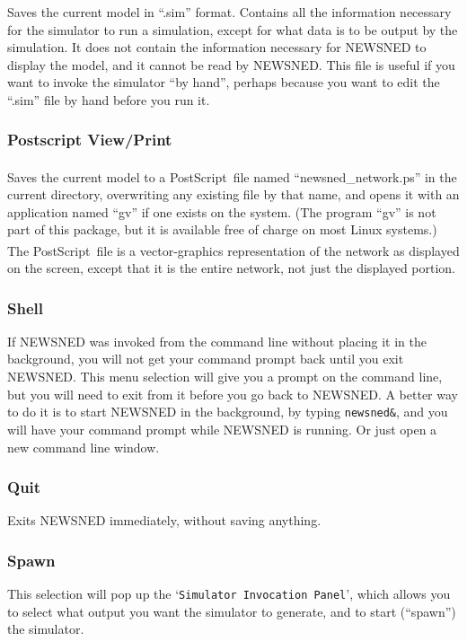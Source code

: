 \documentclass[12pt,openany,oneside]{book}
\newcommand{\ticommand}[1]{\texttt{#1}}
\newcommand{\tisamp}[1]{`\texttt{#1}'}
\newcommand{\registeredsymbol}{\textsuperscript{\textregistered}}
\begin{document}
Saves the current model in ``.sim'' format.  Contains all the
information necessary for the simulator to run a simulation, except
for what data is to be output by the simulation.  It does not contain
the information necessary for NEWSNED to display the model, and it
cannot be read by NEWSNED.  This file is useful if you want to invoke
the simulator ``by hand'', perhaps because you want to edit the
``.sim'' file by hand before you run it.

\subsubsection*{Postscript View/Print}

Saves the current model to a PostScript\registeredsymbol\ file named
``newsned\_network.ps'' in the current directory, overwriting any
existing file by that name, and opens it with an application named
``gv'' if one exists on the system.  (The program ``gv'' is not part
of this package, but it is available free of charge on most Linux
systems.)  The PostScript\registeredsymbol\ file is a vector-graphics
representation of the network as displayed on the screen, except that
it is the entire network, not just the displayed portion.

\subsubsection*{Shell}

If NEWSNED was invoked from the command line without placing it in the
background, you will not get your command prompt back until you exit
NEWSNED.  This menu selection will give you a prompt on the command
line, but you will need to exit from it before you go back to
NEWSNED.  A better way to do it is to start NEWSNED in the background,
by typing \ticommand{newsned\&}, and you will have your command prompt while
NEWSNED is running.  Or just open a new command line window.

\subsubsection*{Quit}

Exits NEWSNED immediately, without saving anything.

\subsubsection{Spawn}
\label{Spawn}

This selection will pop up the \tisamp{Simulator Invocation Panel}, which
allows you to select what output you want the simulator to generate,
and to start (``spawn'') the simulator.
\end{document}
